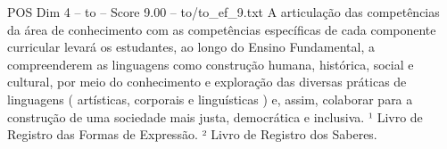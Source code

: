 \begin{textsample}{POS Dim 4 – to – Score 9.00 – to/to\_ef\_9.txt}
A articulação das competências da área de conhecimento com as competências específicas de cada componente curricular levará os estudantes, ao longo do Ensino Fundamental, a compreenderem as linguagens como construção humana, histórica, social e cultural, por meio do conhecimento e exploração das diversas práticas de linguagens ( artísticas, corporais e linguísticas ) e, assim, colaborar para a construção de uma sociedade mais justa, democrática e inclusiva. ¹ Livro de Registro das Formas de Expressão. ² Livro de Registro dos Saberes.

\end{textsample}
